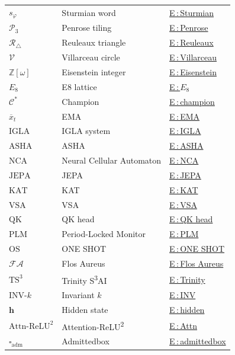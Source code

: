 \begin{longtable}{p{2.4cm} p{6.0cm} p{2.4cm}}
$s_\varphi$ & Sturmian word & \hyperref[entry:sturmian]{E\,:\,Sturmian} \\
$\mathcal{P}_3$ & Penrose tiling & \hyperref[entry:penrose]{E\,:\,Penrose} \\
$\mathcal{R}_\triangle$ & Reuleaux triangle & \hyperref[entry:reuleaux]{E\,:\,Reuleaux} \\
$\mathcal{V}$ & Villarceau circle & \hyperref[entry:villarceau]{E\,:\,Villarceau} \\
$\mathbb{Z}[\omega]$ & Eisenstein integer & \hyperref[entry:eisenstein]{E\,:\,Eisenstein} \\
$E_8$ & E8 lattice & \hyperref[entry:e8]{E\,:\,$E_8$} \\
$\mathcal{C}^*$ & Champion & \hyperref[entry:champion]{E\,:\,champion} \\
$\overline{x}_t$ & EMA & \hyperref[entry:ema]{E\,:\,EMA} \\
$\mathrm{IGLA}$ & IGLA system & \hyperref[entry:igla]{E\,:\,IGLA} \\
$\mathrm{ASHA}$ & ASHA & \hyperref[entry:asha]{E\,:\,ASHA} \\
$\mathrm{NCA}$ & Neural Cellular Automaton & \hyperref[entry:nca]{E\,:\,NCA} \\
$\mathrm{JEPA}$ & JEPA & \hyperref[entry:jepa]{E\,:\,JEPA} \\
$\mathrm{KAT}$ & KAT & \hyperref[entry:kat]{E\,:\,KAT} \\
$\mathrm{VSA}$ & VSA & \hyperref[entry:vsa]{E\,:\,VSA} \\
$\mathrm{QK}$ & QK head & \hyperref[entry:qk-head]{E\,:\,QK head} \\
$\mathrm{PLM}$ & Period-Locked Monitor & \hyperref[entry:plm]{E\,:\,PLM} \\
$\mathrm{OS}$ & ONE SHOT & \hyperref[entry:one-shot]{E\,:\,ONE SHOT} \\
$\mathcal{FA}$ & Flos Aureus & \hyperref[entry:flos-aureus]{E\,:\,Flos Aureus} \\
$\mathrm{TS}^3$ & Trinity S\textsuperscript{3}AI & \hyperref[entry:trinity-s3ai]{E\,:\,Trinity} \\
$\mathrm{INV}\text{-}k$ & Invariant $k$ & \hyperref[sec:lexicon-invs]{E\,:\,INV} \\
$\mathbf{h}$ & Hidden state & \hyperref[entry:hidden]{E\,:\,hidden} \\
$\mathrm{Attn\text{-}ReLU}^2$ & Attention-ReLU\textsuperscript{2} & \hyperref[entry:attention-relu2]{E\,:\,Attn} \\
$\square_{\mathrm{adm}}$ & Admittedbox & \hyperref[entry:admittedbox]{E\,:\,admittedbox} \\
\end{longtable}


